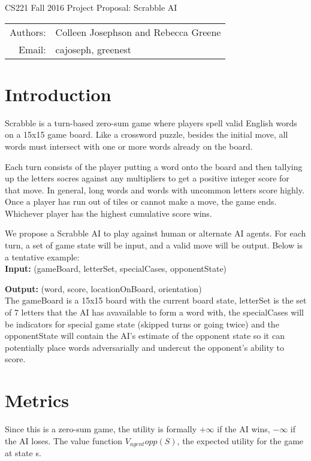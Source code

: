 \documentclass[12pt]{article}
\begin{document}
\begin{center}
{\Large CS221 Fall 2016 Project Proposal: Scrabble AI}

\begin{tabular}{rl}
  Authors: & Colleen Josephson and Rebecca Greene\\
  Email: & cajoseph, greenest
\end{tabular}
\end{center}

\section*{Introduction}
Scrabble is a turn-based zero-sum game where players spell valid English words on a 15x15 game board. Like a crossword puzzle, besides the initial move, all words must intersect with one or more words already on the board.

Each turn consists of the player putting a word onto the board and
then tallying up the letters socres against any multipliers to get a
positive integer score for that move. In general, long words and words
with uncommon letters score highly. Once a player has run out of tiles
or cannot make a move, the game ends. Whichever player has the highest
cumulative score wins.

We propose a Scrabble AI to play against human or alternate AI agents. For each turn, a set of game state will be input, and a valid move will be output. Below is a tentative example:\\

\textbf{Input:} (gameBoard, letterSet, specialCases, opponentState)

\textbf{Output:} (word, score, locationOnBoard, orientation)\\


The gameBoard is a 15x15 board with the current board state, letterSet is the set of 7 letters that the AI has avavailable to form a word with, the specialCases will be indicators for special game state (skipped turns or going twice) and the opponentState will contain the AI's estimate of the opponent state so it can potentially place words adversarially and undercut the opponent's ability to score.

\section{Metrics}
Since this is a zero-sum game, the utility is formally $+\infty$ if the AI wins, $-\infty$ if the AI loses. The value function $V_{agent}{opp}(S)$, the expected utility for the game at state s.
\end{document}
